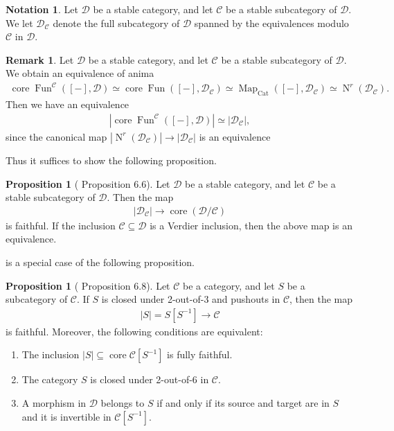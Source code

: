 \documentclass[a4paper,dvipdfmx,11pt,reqno]{amsart}
\DeclareMathOperator{\Map}{Map}
\DeclareMathOperator{\N}{N}
\DeclareMathOperator{\Fun}{Fun}
\newcommand{\C}{\mathcal{C}}
\newcommand{\D}{\mathcal{D}}
\DeclareMathOperator{\core}{core}
\newcommand{\Cat}{\mathrm{Cat}}
\theoremstyle{definition}
\newtheorem{notation}[theorem]{Notation}
\newtheorem{proposition}[theorem]{Proposition}
\newtheorem{remark}[theorem]{Remark}
\begin{document}

\begin{notation}
  Let $\D$ be a stable category, and let $\C$ be a stable subcategory of $\D$.
  We let $\D_{\C}$ denote the full subcategory of $\D$ spanned by the equivalences modulo $\C$ in $\D$.
\end{notation}

\begin{remark}
  Let $\D$ be a stable category, and let $\C$ be a stable subcategory of $\D$.
  We obtain an equivalence of anima 
  \begin{align*}
    \core\Fun^{\C}([-],\D) 
    \simeq \core\Fun([-],\D_{\C})
    \simeq \Map_{\Cat}([-],\D_{\C})
    \simeq \N^r(\D_{\C}).
  \end{align*}
  Then we have an equivalence 
  \begin{align*}
    |\core\Fun^{\C}([-],\D)| \simeq |\D_{\C}|,
  \end{align*}
  since the canonical map $|\N^r(\D_{\C})| \to |\D_{\C}|$ is an equivalence
\end{remark}

Thus it suffices to show the following proposition.

\begin{proposition}[\cite{HLS23} Proposition 6.6] \label{HLS23.prop.6.6} 
  Let $\D$ be a stable category, and let $\C$ be a stable subcategory of $\D$.
  Then the map 
  \begin{align*}
    |\D_{\C}| \to \core(\D/\C)
  \end{align*}
  is faithful.
  If the inclusion $\C \subseteq \D$ is a Verdier inclusion, then the above map is an equivalence.
\end{proposition}

 is a special case of the following proposition.

\begin{proposition}[\cite{HLS23} Proposition 6.8] \label{HLS23.prop.6.8} 
  Let $\C$ be a category, and let $S$ be a subcategory of $\C$.
  If $S$ is closed under 2-out-of-3 and pushouts in $\C$, then the map 
  \begin{align*}
    |S| = S[S^{-1}] \to \C
  \end{align*}
  is faithful. 
  Moreover, the following conditions are equivalent:
  \begin{enumerate}
    \item The inclusion $|S| \subseteq \core\C[S^{-1}]$ is fully faithful.
    \item The category $S$ is closed under 2-out-of-6 in $\C$.
    \item A morphism in $\D$ belongs to $S$ if and only if its source and target are in $S$ and it is invertible in $\C[S^{-1}]$.
  \end{enumerate}
\end{proposition}
\end{document}
